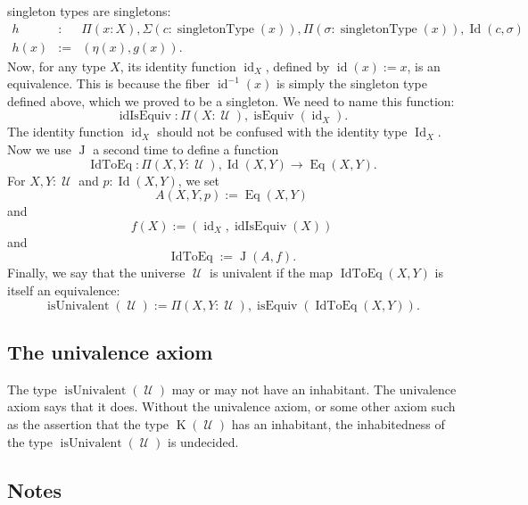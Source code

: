 \documentclass{article}
\newcommand{\Id}{\operatorname{Id}}
\newcommand{\J}{\operatorname{J}}
\newcommand{\K}{\operatorname{K}}
\newcommand{\U}{\operatorname{\mathcal{U}}}
\newcommand{\isEquiv}{\operatorname{isEquiv}}
\newcommand{\Eq}{\operatorname{Eq}}
\newcommand{\singletonType}{\operatorname{singletonType}}
\newcommand{\id}{\operatorname{id}}
\newcommand{\idIsEquiv}{\operatorname{idIsEquiv}}
\newcommand{\IdToEq}{\operatorname{IdToEq}}
\newcommand{\isUnivalent}{\operatorname{isUnivalent}}
\begin{document}
singleton types are singletons:
\begin{eqnarray*}
   h & : & \Pi(x:X), \Sigma(c:\singletonType(x)), \Pi(\sigma :\singletonType(x)), \Id(c,\sigma )\\
   h(x) & := & (\eta(x),g(x)).
\end{eqnarray*}
Now, for any type $X$, its identity function $\id_X$, defined by
$\id(x) := x$, is an equivalence. This is because the fiber
$\id^{-1}(x)$ is simply the singleton type defined above, which we
proved to be a singleton. We need to name this function:
\[
   \idIsEquiv : \Pi(X:\U), \isEquiv(\id_X).
 \]
The identity function $\id_X$ should not be confused with the identity
type $\Id_X$. Now we use $\J$ a second time to define a function
\[
   \IdToEq : \Pi(X,Y:\U), \Id(X,Y) \to  \Eq(X,Y).
\]
For $X,Y:\U$ and $p:\Id(X,Y)$, we set
\[
   A(X,Y,p) := \Eq(X,Y)
\]  
and
\[
   f(X) := (\id_X , \idIsEquiv(X))
\]
and
\[
   \IdToEq := \J(A,f).
\]
Finally, we say that the universe $\U$ is univalent if the map
$\IdToEq(X,Y)$ is itself an equivalence:
\[
   \isUnivalent(\U) := \Pi(X,Y:\U), \isEquiv(\IdToEq(X,Y)).
\]

\subsection{The univalence axiom}

The type $\isUnivalent(\U)$ may or may not have an inhabitant. The
univalence axiom says that it does. Without the univalence axiom, or
some other axiom such as the assertion that the type $\K(\U)$ has an
inhabitant, the inhabitedness of the type $\isUnivalent(\U)$ is
undecided.

\subsection{Notes}
\end{document}
